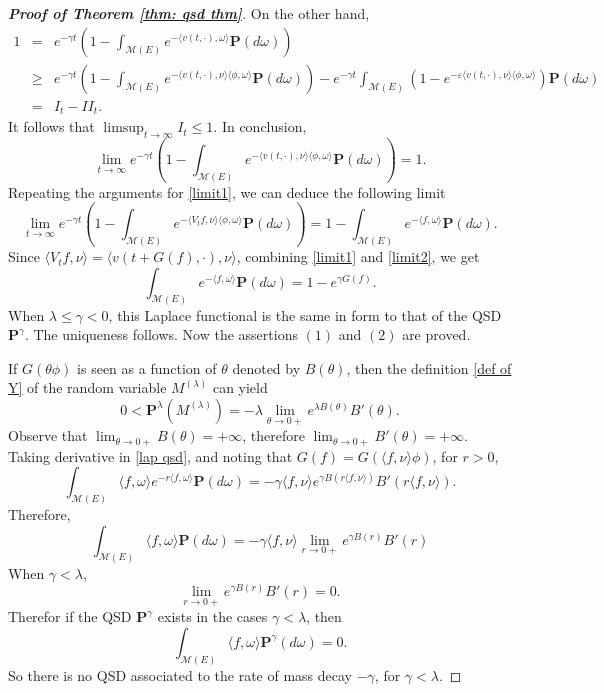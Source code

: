 \documentclass[12pt,a4paper]{amsart}
\theoremstyle{plain}
\theoremstyle{definition}
\numberwithin{equation}{section}
\begin{document}
\begin{proof}[{\bf Proof of Theorem \ref{thm: qsd thm}}]
On the other hand,
\begin{eqnarray*}
1&=&e^{-\gamma t}\left(1-\int_{\mathcal M(E)}e^{-\langle v(t,\cdot),\omega\rangle }\mathbf P(d\omega)\right)\\
&\geq &e^{-\gamma t}\left(1-\int_{\mathcal M(E)}e^{-\langle v(t,\cdot),\nu\rangle\langle\phi,\omega\rangle }\mathbf P(d\omega)\right)-e^{-\gamma t}\int_{\mathcal M(E)}\left(1-e^{-\varepsilon\langle v(t,\cdot),\nu\rangle\langle\phi,\omega\rangle  }\right)\mathbf P(d\omega)\\
&=&I_t-II_t.
\end{eqnarray*}
It follows that $\limsup_{t\to\infty}I_t\leq 1$. In conclusion,
\begin{equation}\label{limit1}
\lim_{t\rightarrow\infty}e^{-\gamma t}\left(1-\int_{\mathcal M(E)}e^{-\langle v(t,\cdot),\nu\rangle\langle\phi,\omega\rangle }\mathbf P(d\omega)\right)=1.
\end{equation}
Repeating the arguments for \eqref{limit1}, we can deduce the following limit
\begin{equation}\label{limit2}
\lim_{t\rightarrow\infty}e^{-\gamma t}\left(1-\int_{\mathcal M(E)}e^{-\langle V_tf,\nu\rangle \langle \phi,\omega\rangle }\mathbf P(d\omega)\right)=1-\int_{\mathcal M(E)}e^{-\langle f,\omega\rangle }\mathbf P(d\omega).
\end{equation}
Since $\langle V_tf,\nu\rangle =\langle v(t+G(f),\cdot),\nu\rangle $, combining \eqref{limit1} and \eqref{limit2}, we get
\begin{equation}\label{lap qsd}
\int_{\mathcal M(E)}e^{-\langle f,\omega\rangle }\mathbf P(d\omega)=1-e^{\gamma G(f)}.
\end{equation}
When  $\lambda\leq\gamma<0$, this Laplace functional is the same in form to that of the QSD $\mathbf P^{\gamma}$.  The uniqueness follows.  Now the assertions $(1)$ and $(2)$ are proved.

 If  $G(\theta\phi)$ is seen as a function of $\theta$ denoted by $B(\theta)$, then the definition \eqref{def of Y} of the
random variable $M^{(\lambda)}$ can yield
\[
0<\mathbf P^{\lambda}(M^{(\lambda)})=-\lambda\lim_{\theta\rightarrow 0+} e^{\lambda B(\theta)}B'(\theta).
\]
Observe that $\lim_{\theta\rightarrow 0+} B(\theta)=+\infty$, therefore $\lim_{\theta\rightarrow 0+}B'(\theta)=+\infty$. Taking derivative in \eqref{lap qsd},
and noting that $G(f)=G(\langle f,\nu\rangle\phi)$, for $r>0$,
\[
\int_{\mathcal M(E)}\langle f,\omega\rangle e^{-r\langle f,\omega\rangle }\mathbf P(d\omega)
=-\gamma \langle f,\nu\rangle  e^{\gamma B(r\langle f,\nu\rangle)}B'(r\langle f,\nu\rangle).
\]
Therefore,
\[
\int_{\mathcal M(E)}\langle f,\omega\rangle \mathbf P(d\omega)=-\gamma \langle f,\nu\rangle  \lim_{r\rightarrow 0+}e^{\gamma B(r)}B'(r)
\]
When $\gamma<\lambda$,
\[
\lim_{r\rightarrow 0+}e^{\gamma B(r)}B'(r)=0.
\]
Therefor if the QSD $\mathbf P^{\gamma}$ exists in the cases $\gamma<\lambda$, then
\[
\int_{\mathcal M(E)}\langle f,\omega\rangle \mathbf P^{\gamma}(d\omega)=0.
\]
So there is no QSD associated to the rate of mass decay $-\gamma$, for $\gamma<\lambda$.
\end{proof}
\end{document}
